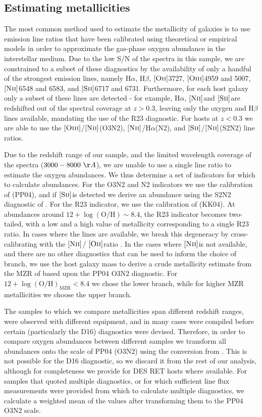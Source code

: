 \documentclass[fleqn,usenatbib,]{mnras}
\newcommand{\halpha}[0]{H$\alpha$}
\newcommand{\hbeta}[0]{H$\beta$}
\newcommand{\OII}[0]{$[\textnormal{\textsc{Oii}}]$}
\newcommand{\OIII}[0]{$[\textnormal{\textsc{Oiii}}]$}
\newcommand{\SII}[0]{$[\textnormal{\textsc{Sii}}]$}
\newcommand{\NII}[0]{$[\textnormal{\textsc{Nii}}]$}
\begin{document}
\subsection{Estimating metallicities \label{subsec:calc_Z}}

The most common method used to estimate the metallicity of galaxies is to use emission line ratios that have been calibrated using theoretical or empirical models in order to approximate the gas-phase oxygen abundance in the interstellar medium. Due to the low S/N of the spectra in this sample, we are constrained to a subset of these diagnostics by the availability of only a handful of the strongest emission lines, namely \halpha, \hbeta, \OII 3727, \OIII 4959 and 5007, \NII 6548 and 6583, and \SII 6717 and 6731. Furthermore, for each host galaxy only a subset of these lines are detected - for example, \halpha, \NII and \SII are redshifted out of the spectral coverage at $z>0.3$, leaving only the oxygen and \hbeta lines available, mandating the use of the R23 diagnostic. For hosts at $z<0.3$ we are able to use the \OIII /\NII (O3N2), \NII /\halpha (N2), and \SII /\NII (S2N2) line ratios. 

Due to the redshift range of our sample, and the limited wavelength coverage of the spectra ($3000-8000~\AA$), we are unable to use a single line ratio to estimate the oxygen abundances. We thus determine a set of indicators for which to calculate abundances. For the O3N2 and N2 indicators we use the calibration of \citet{Pettini2004} (PP04), and if \SII is detected we derive an abundance using the S2N2 diagnostic of \citet{Dopita2016}. For the R23 indicator, we use the calibration of \citet{Kobulnicky2004} (KK04). At abundances around $12 + \log \mathrm{(O/H)} \sim 8.4$, the R23 indicator becomes two-tailed, with a low and a high value of metallicity corresponding to a single R23 ratio. In cases where the lines are available, we break this degeneracy by cross-calibrating with the \NII / \OII ratio \citep{Kewley2008}. In the cases where \NII is not available, and there are no other diagnostics that can be used to inform the choice of branch, we use the host galaxy mass to derive a crude metallicity estimate from the MZR of \citet{Kewley2008} based upon the PP04 O3N2 diagnostic. For $12 + \log \mathrm{(O/H)}_{\mathrm{MZR}} < 8.4$ we chose the lower branch, while for higher MZR metallicities we choose the upper branch.

The samples to which we compare metallicities span different redshift ranges, were observed with different equipment, and in many cases were compiled before certain (particularly the D16) diagnostics were devised. Therefore, in order to compare oxygen abundances between different samples we transform all abundances onto the scale of PP04 (O3N2) using the conversion from \citet{Kewley2008}. This is not possible for the D16 diagnostic, so we discard it from the rest of our analysis, although for completeness we provide for DES RET hosts where available. For samples that quoted multiple diagnostics, or for which sufficient line flux measurements were provided from which to calculate multiple diagnostics, we calculate a weighted mean of the values after transforming them to the PP04 O3N2 scale.
\end{document}
